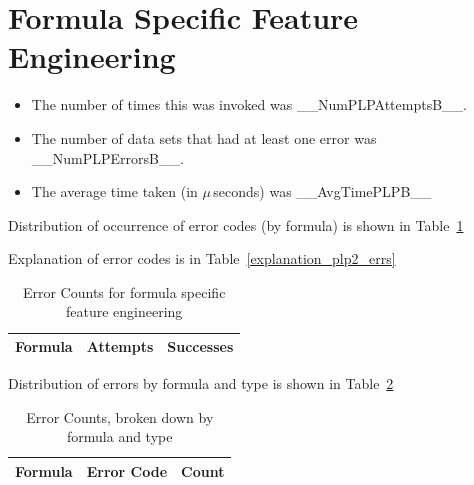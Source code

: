 \documentclass[letterpaper,12pt]{article}
\newcommand{\bi}{\begin{itemize}}
\newcommand{\ei}{\end{itemize}}
\newcommand{\NumPLPErrorsB}{__NumPLPErrorsB__}
\newcommand{\NumPLPAttemptsB}{__NumPLPAttemptsB__}
\newcommand{\AvgTimePLPB}{__AvgTimePLPB__}
\begin{document}
\section{Formula Specific Feature Engineering}
\label{PLP2}

\bi
\item The number of times this was invoked was \NumPLPAttemptsB.
\item The number of data sets that had at least one error was
  \NumPLPErrorsB.
\item The average time taken (in \(\mu\,\)seconds) was \AvgTimePLPB
\ei

Distribution of occurrence of error codes (by formula) is shown in Table~\ref{plp2_errs}

Explanation of error codes is in Table~\ref{explanation_plp2_errs}
\begin{table}
  \centering
  \begin{tabular}{|l|l|l|} \hline \hline
    {\bf Formula} & {\bf Attempts} & {\bf Successes} \\ \hline 
     
    \hline
  \end{tabular}
  \caption{Error Counts for formula specific feature engineering}
  \label{plp2_errs}
\end{table}

Distribution of errors by formula and type is shown in Table~\ref{plp2_errs_B}
\begin{table}
  \centering
  \begin{tabular}{|l|l|l|} \hline \hline
    {\bf Formula} & {\bf Error Code} & {\bf Count} \\ \hline 
      
    \hline
  \end{tabular}
  \caption{Error Counts, broken down by formula and type}
  \label{plp2_errs_B}
\end{table}
\end{document}
